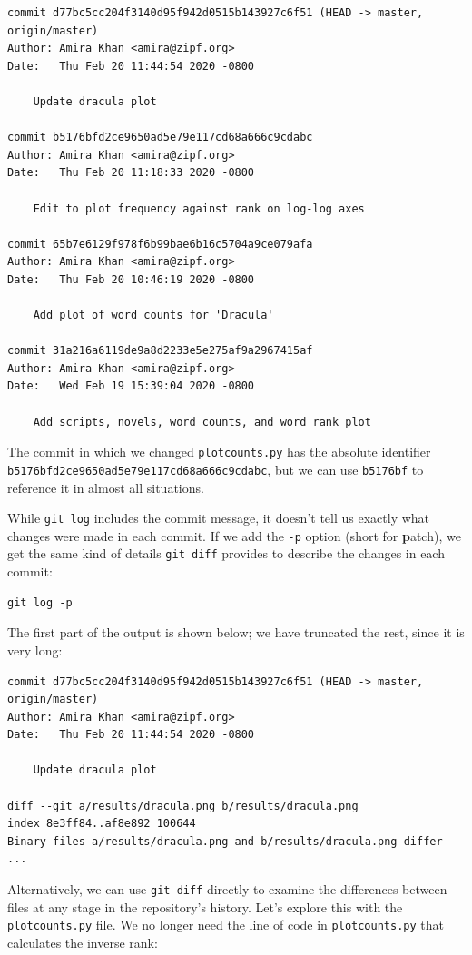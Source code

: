\documentclass[
]{krantz}
\begin{document}
\begin{verbatim}
commit d77bc5cc204f3140d95f942d0515b143927c6f51 (HEAD -> master, origin/master)
Author: Amira Khan <amira@zipf.org>
Date:   Thu Feb 20 11:44:54 2020 -0800

    Update dracula plot

commit b5176bfd2ce9650ad5e79e117cd68a666c9cdabc
Author: Amira Khan <amira@zipf.org>
Date:   Thu Feb 20 11:18:33 2020 -0800

    Edit to plot frequency against rank on log-log axes

commit 65b7e6129f978f6b99bae6b16c5704a9ce079afa
Author: Amira Khan <amira@zipf.org>
Date:   Thu Feb 20 10:46:19 2020 -0800

    Add plot of word counts for 'Dracula'

commit 31a216a6119de9a8d2233e5e275af9a2967415af
Author: Amira Khan <amira@zipf.org>
Date:   Wed Feb 19 15:39:04 2020 -0800

    Add scripts, novels, word counts, and word rank plot
\end{verbatim}

The commit in which we changed \texttt{plotcounts.py}
has the absolute identifier \texttt{b5176bfd2ce9650ad5e79e117cd68a666c9cdabc},
but we can use \texttt{b5176bf} to reference it in almost all situations.

While \texttt{git\ log} includes the commit message,
it doesn't tell us exactly what changes were made in each commit.
If we add the \texttt{-p} option (short for \textbf{p}atch),
we get the same kind of details \texttt{git\ diff} provides
to describe the changes in each commit:

\begin{verbatim}
git log -p
\end{verbatim}

The first part of the output is shown below;
we have truncated the rest,
since it is very long:

\begin{verbatim}
commit d77bc5cc204f3140d95f942d0515b143927c6f51 (HEAD -> master, origin/master)
Author: Amira Khan <amira@zipf.org>
Date:   Thu Feb 20 11:44:54 2020 -0800

    Update dracula plot

diff --git a/results/dracula.png b/results/dracula.png
index 8e3ff84..af8e892 100644
Binary files a/results/dracula.png and b/results/dracula.png differ
...
\end{verbatim}

Alternatively,
we can use \texttt{git\ diff} directly
to examine the differences between files at any stage in the repository's history.
Let's explore this with the \texttt{plotcounts.py} file.
We no longer need the line of code in \texttt{plotcounts.py}
that calculates the inverse rank:
\end{document}
